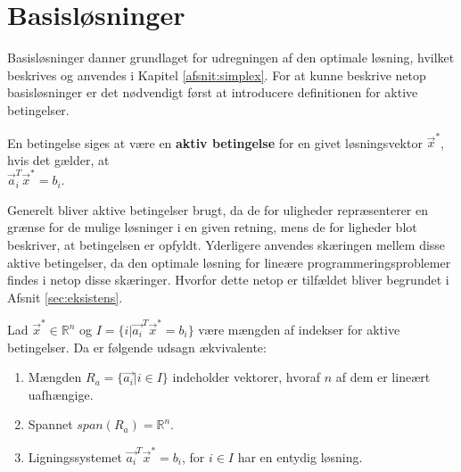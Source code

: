 \section{Basisløsninger}


Basisløsninger danner grundlaget for udregningen af den optimale løsning, hvilket beskrives og anvendes i Kapitel \ref{afsnit:simplex}. For at kunne beskrive netop basisløsninger er det nødvendigt først at introducere definitionen for aktive betingelser.%

\begin{defn}
En betingelse siges at være en \textbf{aktiv betingelse} for en givet løsningsvektor $\vec{x}^*$, hvis det gælder, at\\ $\vec{a}_i^T \vec{x}^* = b_i$.
\label{def:aktiv}
\end{defn}

Generelt bliver aktive betingelser brugt, da de for uligheder repræsenterer en grænse for de mulige løsninger i en given retning, mens de for ligheder blot beskriver, at betingelsen er opfyldt.
Yderligere anvendes skæringen mellem disse aktive betingelser, da den optimale løsning for lineære programmeringsproblemer findes i netop disse skæringer. Hvorfor dette netop er tilfældet bliver begrundet i Afsnit \ref{sec:eksistens}.

\begin{stn}
Lad $\vec{x}^* \in \mathds{R}^n$ og $I = \{i | \vec{a_i}^T \vec{x}^* = b_i\}$ være mængden af indekser for aktive betingelser. Da er følgende udsagn ækvivalente:
\begin{enumerate}[label=(\alph*)]
\item Mængden $R_a =\{\vec{a_i}| i\in I\}$ indeholder vektorer, hvoraf $n$ af dem er lineært uafhængige.
\item Spannet $span(R_a) = \mathds{R}^n$.
\item Ligningssystemet $\vec{a_i}^T \vec{x}^* = b_i$, for $i \in I$ har en entydig løsning.
\end{enumerate}
\label{stn:uniklosning}
\end{stn} %

